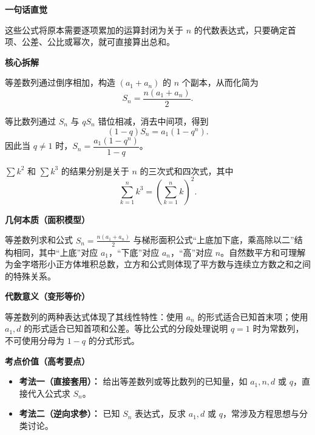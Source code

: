 \begin{explanationbox}
	\textbf{\textcolor{CExplanation}{一句话直觉}}

	这些公式将原本需要逐项累加的运算封闭为关于 \(n\) 的代数表达式，只要确定首项、公差、公比或幂次，就可直接算出总和。

	\medskip
	\textbf{\textcolor{CExplanation}{核心拆解}}
	\begin{description}[style=nextline, leftmargin=2.8em, labelsep=0.5em, itemsep=0.45em]
		\item[\textbf{要点一（等差配对）：}]
		      等差数列通过倒序相加，构造 \((a_1+a_n)\) 的 \(n\) 个副本，从而化简为
		      \[
			      S_n=\frac{n(a_1+a_n)}{2}.
		      \]
		\item[\textbf{要点二（等比错位）：}]
		      等比数列通过 \(S_n\) 与 \(qS_n\) 错位相减，消去中间项，得到
		      \[
			      (1-q)S_n=a_1(1-q^n).
		      \]
		      因此当 \(q\neq1\) 时，\(S_n=\dfrac{a_1(1-q^n)}{1-q}\)。
		\item[\textbf{要点三（自然幂记忆）：}]
		      \(\sum k^2\) 和 \(\sum k^3\) 的结果分别是关于 \(n\) 的三次式和四次式，其中
		      \[
			      \sum_{k=1}^{n}k^3=\left(\sum_{k=1}^{n}k\right)^2.
		      \]
	\end{description}

	\medskip
	\textbf{\textcolor{CExplanation}{几何本质（面积模型）}}

	等差数列求和公式 \(S_n=\frac{n(a_1+a_n)}{2}\) 与梯形面积公式“上底加下底，乘高除以二”结构相同，其中“上底”对应 \(a_1\)，“下底”对应 \(a_n\)，“高”对应 \(n\)。自然数平方和可理解为金字塔形小正方体堆积总数，立方和公式则体现了平方数与连续立方数之和之间的特殊关系。

	\medskip
	\textbf{\textcolor{CExplanation}{代数意义（变形等价）}}

	等差数列的两种表达式体现了其线性特性：使用 \(a_n\) 的形式适合已知首末项；使用 \(a_1,d\) 的形式适合已知首项和公差。等比公式的分段处理说明 \(q=1\) 时为常数列，不可使用分母为 \(1-q\) 的分式形式。

	\medskip
	\textbf{\textcolor{CExplanation}{考点价值（高考要点）}}
	\begin{itemize}[leftmargin=*, itemsep=0.5em, topsep=0.4em]
		\item \textbf{考法一（直接套用）：} 给出等差数列或等比数列的已知量，如 \(a_1,n,d\) 或 \(q\)，直接代入公式求 \(S_n\)。
		\item \textbf{考法二（逆向求参）：} 已知 \(S_n\) 表达式，反求 \(a_1,d\) 或 \(q\)，常涉及方程思想与分类讨论。
	\end{itemize}


\end{explanationbox}
